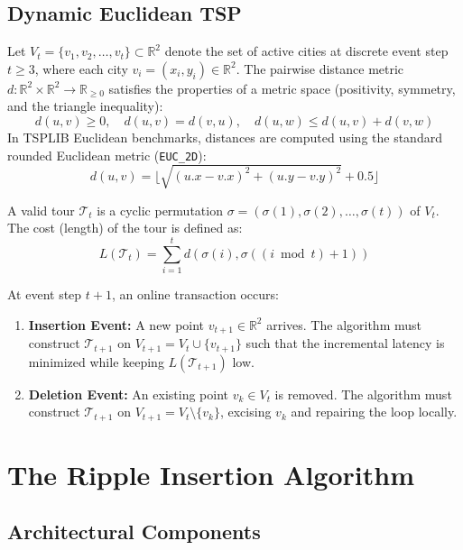 \documentclass[11pt,a4paper]{article}
\theoremstyle{definition}
\begin{document}
\subsection{Dynamic Euclidean TSP}

Let $V_t = \{v_1, v_2, \dots, v_t\} \subset \mathbb{R}^2$ denote the set of active cities at discrete event step $t \ge 3$, where each city $v_i = (x_i, y_i) \in \mathbb{R}^2$. The pairwise distance metric $d: \mathbb{R}^2 \times \mathbb{R}^2 \to \mathbb{R}_{\ge 0}$ satisfies the properties of a metric space (positivity, symmetry, and the triangle inequality):
\begin{equation}
d(u, v) \ge 0, \quad d(u, v) = d(v, u), \quad d(u, w) \le d(u, v) + d(v, w)
\end{equation}
In TSPLIB Euclidean benchmarks, distances are computed using the standard rounded Euclidean metric (\texttt{EUC\_2D}):
\begin{equation}
d(u, v) = \lfloor \sqrt{(u.x - v.x)^2 + (u.y - v.y)^2} + 0.5 \rfloor
\end{equation}

A valid tour $\mathcal{T}_t$ is a cyclic permutation $\sigma = (\sigma(1), \sigma(2), \dots, \sigma(t))$ of $V_t$. The cost (length) of the tour is defined as:
\begin{equation}
L(\mathcal{T}_t) = \sum_{i=1}^t d(\sigma(i), \sigma((i \bmod t) + 1))
\end{equation}

At event step $t+1$, an online transaction occurs:
\begin{enumerate}
    \item \textbf{Insertion Event:} A new point $v_{t+1} \in \mathbb{R}^2$ arrives. The algorithm must construct $\mathcal{T}_{t+1}$ on $V_{t+1} = V_t \cup \{v_{t+1}\}$ such that the incremental latency is minimized while keeping $L(\mathcal{T}_{t+1})$ low.
    \item \textbf{Deletion Event:} An existing point $v_k \in V_t$ is removed. The algorithm must construct $\mathcal{T}_{t+1}$ on $V_{t+1} = V_t \setminus \{v_k\}$, excising $v_k$ and repairing the loop locally.
\end{enumerate}

\section{The Ripple Insertion Algorithm}

\subsection{Architectural Components}
\end{document}

